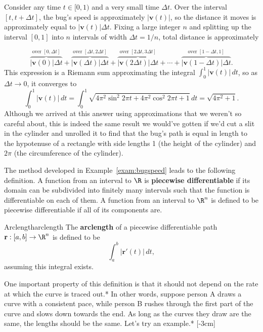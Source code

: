 \documentclass[indent]{watsonbook}
\begin{document}
{\begin{solution}
\begin{insetfigure}{\usebox{\asybox}}
    Consider any time $t \in [0,1)$ and a very small time $\Delta
    t$. Over the interval $[t,t+\Delta t]$, the bug's speed is
    approximately $|\mathbf{v}(t)|$, so the distance it moves is
    approximately equal to $|\mathbf{v}(t)|\Delta t$. Fixing a large
    integer $n$ and splitting up the interval $[0,1]$ into $n$ intervals
    of width $\Delta t = 1/n$, total distance is approximately
  \end{insetfigure}
  \[
    \overbrace{|\mathbf{v}(0)|\Delta t}^{\text{over }[0,\Delta t]}+
    \overbrace{|\mathbf{v}(\Delta t)|\Delta t}^{\text{over }[\Delta t,2\Delta t]} +
    \overbrace{|\mathbf{v}(2\Delta t)|\Delta t}^{\text{over }[2\Delta
      t,3\Delta t]}  + \cdots +
    \overbrace{|\mathbf{v}(1-\Delta t)|\Delta t}^{\text{over
      }[1-\Delta t,1]}.
  \]
  This expression is a Riemann sum approximating the integral
  $\int_0^1 |\mathbf{v}(t)| \, {d} t$, so as $\Delta t \to 0$, it
  converges to
  \[
    \int_0^1 |\mathbf{v}(t)| \, {d} t = \int_0^1 \sqrt{4\pi^2\sin^2
      2\pi t + 4\pi^2 \cos^2 2 \pi t + 1} \, {d} t =
    \boxed{\sqrt{4\pi^2 + 1}}.
  \]
  Although we arrived at this answer using approximations that we
  weren't so careful about, this is indeed the same result we
  would've gotten if we'd cut a slit in the cylinder and unrolled it
  to find that the bug's path is equal in length to the hypotenuse of
  a rectangle with side lengths 1 (the height of the cylinder) and
  $2\pi$ (the circumference of the cylinder).
\end{solution}

The method developed in Example~\ref{exam:bugspeed} leads to the
following definition. A function from an interval to $\R$ is
\textbf{piecewise differentiable} if its domain can be subdivided into
finitely many intervals such that the function is differentiable on
each of them. A function from an interval to $\R^n$ is defined to be
piecewise differentiable if all of its components are.

\begin{defn}{Arclength}{arclength}
  The \textbf{arclength} of a piecewise differentiable path
  $\mathbf{r}:[a,b] \to \R^n$ is defined to be
  \[
    \int_a^b |\mathbf{r}'(t)| \, {d} t,
  \]
  assuming this integral exists.
\end{defn}

One important property of this definition is that it should not depend
on the rate at which the curve is traced out.* In other words, suppose
person A draws a curve with a consistent pace, while person B rushes
through the first part of the curve and slows down towards the end. As
long as the curves they draw are the same, the lengths should be the
same. Let's try an example.* [-3cm] 

}
\end{document}
